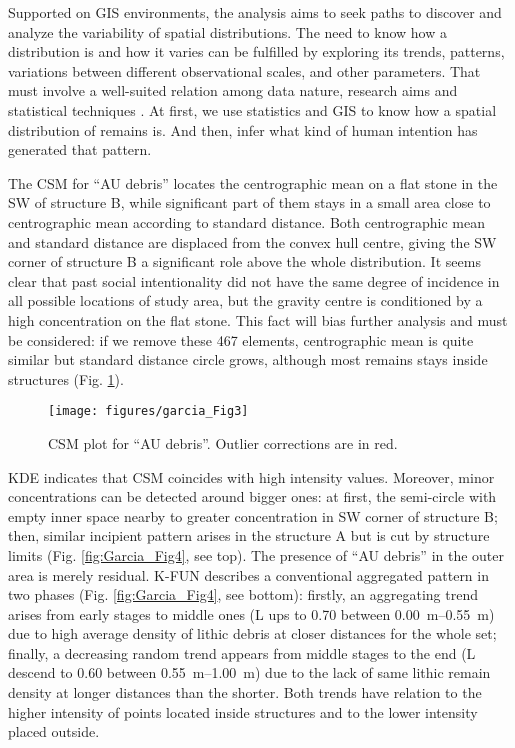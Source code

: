 Supported on GIS environments, the analysis aims to seek paths to discover and analyze the variability of spatial distributions. The need to know how a distribution is and how it varies can be fulfilled by exploring its trends, patterns, variations between different observational scales, and other parameters. That must involve a well-suited relation among data nature, research aims and statistical techniques \parencites{Anselin_1999}{Bivand_2010}. At first, we use statistics and GIS to know how a spatial distribution of remains is. And then, infer what kind of human intention has generated that pattern. 


The CSM for “AU debris” locates the centrographic mean on a flat stone in the SW of structure B, while significant part of them stays in a small area close to centrographic mean according to standard distance. Both centrographic mean and standard distance are displaced from the convex hull centre, giving the SW corner of structure B a significant role above the whole distribution. It seems clear that past social intentionality did not have the same degree of incidence in all possible locations of study area, but the gravity centre is conditioned by a high concentration on the flat stone. This fact will bias further analysis and must be considered: if we remove these \num{467} elements, centrographic mean is quite similar but standard distance circle grows, although most remains stays inside structures (Fig. \ref{fig:Garcia_Fig3}).

\begin{figure}
	\texttt{[image: figures/garcia\_Fig3]}
	\centering
	\caption{CSM plot for “AU debris”. Outlier corrections are in red.}
	\label{fig:Garcia_Fig3}
\end{figure}

KDE indicates that CSM coincides with high intensity values. Moreover, minor concentrations can be detected around bigger ones: at first, the semi-circle with empty inner space nearby to greater concentration in SW corner of structure B; then, similar incipient pattern arises in the structure A but is cut by structure limits (Fig. \ref{fig:Garcia_Fig4}, see top). The presence of “AU debris” in the outer area is merely residual. K-FUN describes a conventional aggregated pattern in two phases (Fig. \ref{fig:Garcia_Fig4}, see bottom): firstly, an aggregating trend arises from early stages to middle ones (L ups to 0.70 between \SIrange{0.00}{0.55}{\metre}) due to high average density of lithic debris at closer distances for the whole set; finally, a decreasing random trend appears from middle stages to the end (L descend to 0.60 between \SIrange{0.55}{1.00}{\metre}) due to the lack of same lithic remain density at longer distances than the shorter. Both trends have relation to the higher intensity of points located inside structures and to the lower intensity placed outside.

